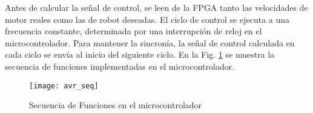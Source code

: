 Antes de calcular la señal de control, se leen de la \gls{FPGA} tanto las velocidades de motor reales como las de robot deseadas. El ciclo de control se ejecuta a una frecuencia constante, determinada por una interrupción de reloj en el microcontrolador. Para mantener la sincronía, la señal de control calculada en cada ciclo se envía al inicio del siguiente ciclo. En la Fig. \ref{fig:funcs_avr} se muestra la secuencia de funciones implementadas en el microcontrolador.

\begin{figure}
	\centering
		\texttt{[image: avr\_seq]}
	\caption{Secuencia de Funciones en el microcontrolador}
	\label{fig:funcs_avr}
\end{figure}

















